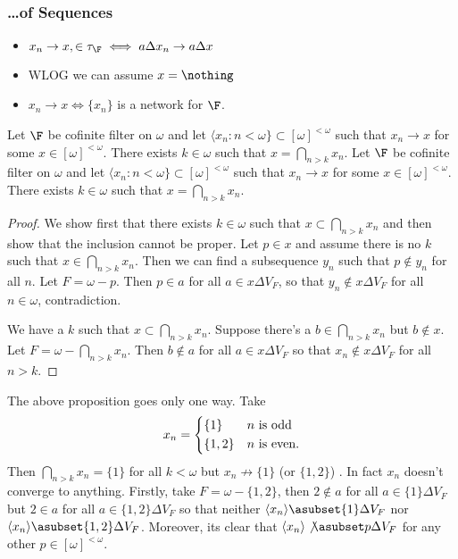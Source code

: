 \documentclass{article}
\begin{document}
\subsubsection*{\dots of Sequences}

\begin{itemize}
    \item \(x_n \to x, \in \tau_{\F} \iff a\Delta x_n \to a\Delta x\)
    \item WLOG we can assume \(x = \nothing\)
    \item \(x_n \to x \iff \{x_n\}\) is a network for \(\F\).
\end{itemize}
\begin{prop}
    Let \(\F\) be cofinite filter on \(\omega\) and let \(\langle x_n :n < \omega\} \subset [\omega]^{<\omega}\) such that \(x_n \to x\) for some \(x \in [\omega]^{<\omega}\). There exists \(k \in \omega\) such that \(x = \bigcap_{n > k}x_n\).
    Let \(\F\) be cofinite filter on \(\omega\) and let \(\langle x_n :n < \omega\} \subset [\omega]^{<\omega}\) such that \(x_n \to x\) for some \(x \in [\omega]^{<\omega}\). There exists \(k \in \omega\) such that \(x = \bigcap_{n > k}x_n\).
\end{prop}
\begin{proof}
    We show first that there exists \(k \in \omega\) such that \(x \subset \bigcap_{n > k}x_n\) and then show that the inclusion cannot be proper. Let \(p \in x\) and assume there is no \(k\) such that \(x \in  \bigcap_{n > k}x_n\). Then we can find a subsequence \(y_n\) such that \(p \not \in y_n\) for all \(n\). Let \(F = \omega- p\). Then \(p \in a\) for all \(a \in x\Delta V_F\), so that \(y_n \not \in x\Delta V_F\) for all \(n \in \omega\), contradiction. 

    We have a \(k\) such that \(x \subset \bigcap_{n > k}x_n\). Suppose there's a \(b \in \bigcap_{n > k}x_n\) but \(b \not \in x\). Let \(F = \omega -\bigcap_{n > k}x_n\). Then \(b \not \in a\) for all \(a \in x\Delta V_F\) so that \(x_n \not \in x\Delta V_F\) for all \(n > k\).
\end{proof}
\begin{rem}
    The above proposition goes only one way. Take 
    \[
        x_n = \begin{dcases}
        \{1\} &  n \text{ is odd}\\
        \{1, 2\} & n \text{ is even.}
        \end{dcases}
    \]
    Then \(\bigcap_{n > k}x_n = \{1\}\) for all \(k < \omega\) but \(x_n \not \to \{1\}\) (or \(\{1, 2\}\)) . In fact \(x_n\) doesn't converge to anything. Firstly, take \(F = \omega - \{1, 2\}\), then \(2 \not \in a\) for all \(a \in \{1\}\Delta V_F\) but \(2 \in a\) for all \(a \in \{1, 2\}\Delta V_F\) so that neither \(\langle x_n \rangle \asubset \{1\}\Delta V_F\) nor \(\langle x_n \rangle \asubset \{1,2\}\Delta V_F\). Moreover, its clear that \(\langle x_n \rangle \not\asubset p\Delta V_F\) for any other \(p \in [\omega]^{<\omega}\).
\end{rem}
\end{document}

